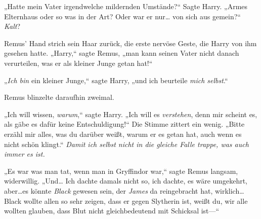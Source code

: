 „Hatte mein Vater irgendwelche mildernden Umstände?“ Sagte Harry. „Armes Elternhaus oder so was in der Art? Oder war er nur… von sich aus gemein?“ \emph{Kalt}?

Remus' Hand strich sein Haar zurück, die erste nervöse Geste, die Harry von ihm gesehen hatte. „Harry,“ sagte Remus, „man kann seinen Vater nicht danach verurteilen, was er als kleiner Junge getan hat!“

„\emph{Ich bin} ein kleiner Junge,“ sagte Harry, „und ich beurteile \emph{mich selbst}.“

Remus blinzelte daraufhin zweimal.

„Ich will wissen, \emph{warum},“ sagte Harry. „Ich will es \emph{verstehen}, denn mir scheint es, als gäbe es dafür keine Entschuldigung!“ Die Stimme zittert ein wenig. „Bitte erzähl mir alles, was du darüber weißt, warum er es getan hat, auch wenn es nicht schön klingt.“ \emph{Damit ich selbst nicht in die gleiche Falle trappe, was auch immer es ist.}

„Es war was man tat, wenn man in Gryffindor war,“ sagte Remus langsam, widerwillig. „Und… Ich dachte damals nicht so, ich dachte, es wäre umgekehrt, aber…es könnte \emph{Black} gewesen sein, der \emph{James} da reingebracht hat, wirklich…Black wollte allen so sehr zeigen, dass er gegen Slytherin ist, weißt du, wir alle wollten glauben, dass Blut nicht gleichbedeutend mit Schicksal ist—“

\later

